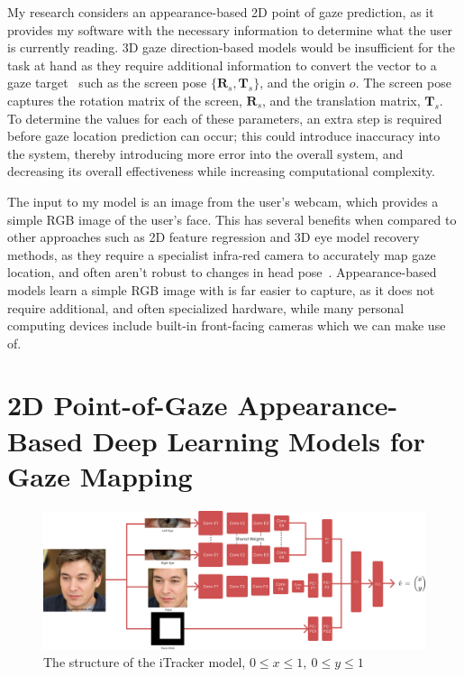 \documentclass{report}
\begin{document}
My research considers an appearance-based 2D point of gaze prediction, as it provides my software with the necessary information to determine what the user is currently reading. 3D gaze direction-based models would be insufficient for the task at hand as they require additional information to convert the vector to a gaze target~\cite{cheng2021survey} such as the screen pose \(\{\pmb R_s, \pmb T_s\}\), and the origin \(o\). The screen pose captures the rotation matrix of the screen, \(\pmb R_s\), and the translation matrix, \(\pmb T_s\). To determine the values for each of these parameters, an extra step is required before gaze location prediction can occur; this could introduce inaccuracy into the system, thereby introducing more error into the overall system, and decreasing its overall effectiveness while increasing computational complexity. 

The input to my model is an image from the user's webcam, which provides a simple RGB image of the user's face. This has several benefits when compared to other approaches such as 2D feature regression and 3D eye model recovery methods, as they require a specialist infra-red camera to accurately map gaze location, and often aren't robust to changes in head pose~\cite{zhu2006nonlinear}. Appearance-based models learn a simple RGB image with is far easier to capture, as it does not require additional, and often specialized hardware, while many personal computing devices include built-in front-facing cameras which we can make use of. 

\section{2D Point-of-Gaze Appearance-Based Deep Learning Models for Gaze Mapping}



\begin{figure}[h]
    \begin{center}
        \includegraphics[scale=0.07]{../assets/itracker-model-my-own.png}
    \end{center}
    \caption{The structure of the iTracker model, \(0\leq x \leq 1,~0 \leq y \leq 1\)}
    \label{fig:itracker-model}
\end{figure}
\end{document}

